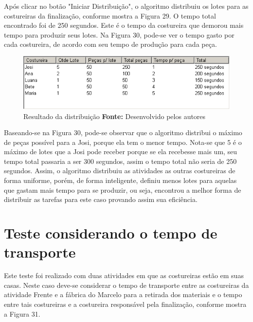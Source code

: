 \par Após clicar no botão "Iniciar Distribuição", o algoritmo distribuiu os lotes para as costureiras da finalização,
conforme mostra a Figura 29. O tempo total encontrado foi de 250 segundos. Este
é o tempo da costureira que demorou mais tempo para produzir seus lotes. Na Figura
30, pode-se ver o tempo gasto por cada costureira, de acordo com seu tempo de
produção para cada peça.


\begin{figure}[h!]
	\centerline{\includegraphics[scale=0.6]{./imagens/test_case1_resultado.png}}
	\caption[Resultado da distribuição]
	{Resultado da distribuição \textbf{Fonte:} Desenvolvido pelos autores}
	\label{fig:exemplo1}
\end{figure}

\par Baseando-se na Figura 30, pode-se observar que o algoritmo distribui o
máximo de peças possível para a Josi, porque ela tem o menor tempo. Nota-se que 5 é o máximo de lotes que a Josi pode receber porque se ela recebesse mais um, seu 
tempo total passaria a ser 300 segundos, assim o tempo total não seria de 250
segundos. Assim, o algoritmo distribuiu as atividades as outras costureiras de forma uniforme, porém, de forma inteligente, definiu menos lotes para aquelas que 
gastam mais tempo para se produzir, ou seja, encontrou a melhor forma de distribuir as tarefas para este caso provando assim
sua eficiência.

\section{Teste considerando o tempo de transporte}
\par Este teste foi realizado com duas atividades em que as costureiras estão em suas casas. Neste caso deve-se considerar
o tempo de transporte entre as costureiras da atividade Frente e a fábrica do Marcelo para a retirada dos materiais e o tempo 
entre tais costureiras e a costureira responsável pela finalização, conforme
mostra a Figura 31.


